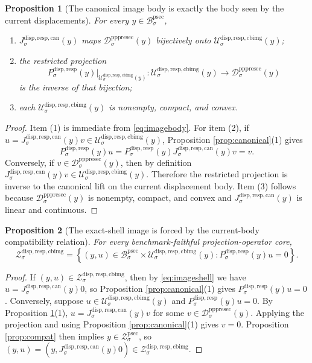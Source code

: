 \documentclass[11pt]{article}
\newcommand{\ProtoSectionBody}[1]{\mathcal B_{#1}^{\mathrm{psec}}}
\newcommand{\ProtoSectionShell}[1]{\mathcal Z_{#1}^{\mathrm{psec}}}
\newcommand{\PrePreProtoSectionResidualBody}[1]{\mathcal D_{#1}^{\mathrm{pppresec}}}
\newcommand{\SubstrateProjection}[1]{P_{#1}^{\mathrm{disp,resp}}}
\newcommand{\CanonicalLift}[1]{J_{#1}^{\mathrm{disp,resp,can}}}
\newcommand{\CanonicalImageBody}[1]{\mathcal U_{#1}^{\mathrm{disp,resp,cbimg}}}
\newcommand{\CanonicalImageShell}[1]{\mathcal Z_{#1}^{\mathrm{disp,resp,cbimg}}}
\newtheorem{proposition}{Proposition}
\begin{document}
\begin{proposition}[The canonical image body is exactly the body seen by the current displacements]
\label{prop:reconstructbody}
For every \(y\in\ProtoSectionBody{\sigma}\),
\begin{enumerate}
    \item \(\CanonicalLift{\sigma}(y)\) maps \(\PrePreProtoSectionResidualBody{\sigma}(y)\) bijectively onto \(\CanonicalImageBody{\sigma}(y)\);
    \item the restricted projection
    \[
    \SubstrateProjection{\sigma}(y)\big|_{\CanonicalImageBody{\sigma}(y)}
    :
    \CanonicalImageBody{\sigma}(y)\to\PrePreProtoSectionResidualBody{\sigma}(y)
    \]
    is the inverse of that bijection;
    \item each \(\CanonicalImageBody{\sigma}(y)\) is nonempty, compact, and convex.
\end{enumerate}
\end{proposition}

\begin{proof}
Item (1) is immediate from \eqref{eq:imagebody}. For item (2), if \(u=\CanonicalLift{\sigma}(y)v\in\CanonicalImageBody{\sigma}(y)\), Proposition \ref{prop:canonical}(1) gives
\[
\SubstrateProjection{\sigma}(y)u
=
\SubstrateProjection{\sigma}(y)\CanonicalLift{\sigma}(y)v
=
v.
\]
Conversely, if \(v\in\PrePreProtoSectionResidualBody{\sigma}(y)\), then by definition \(\CanonicalLift{\sigma}(y)v\in\CanonicalImageBody{\sigma}(y)\). Therefore the restricted projection is inverse to the canonical lift on the current displacement body. Item (3) follows because \(\PrePreProtoSectionResidualBody{\sigma}(y)\) is nonempty, compact, and convex and \(\CanonicalLift{\sigma}(y)\) is linear and continuous.
\end{proof}

\begin{proposition}[The exact-shell image is forced by the current-body compatibility relation]
\label{prop:reconstructshell}
For every benchmark-faithful projection-operator core,
\[
\CanonicalImageShell{\sigma}
=
\left\{
(y,u)\in\ProtoSectionBody{\sigma}\times\CanonicalImageBody{\sigma}(y):
\SubstrateProjection{\sigma}(y)u=0
\right\}.
\]
\end{proposition}

\begin{proof}
If \((y,u)\in\CanonicalImageShell{\sigma}\), then by \eqref{eq:imageshell} we have \(u=\CanonicalLift{\sigma}(y)0\), so Proposition \ref{prop:canonical}(1) gives \(\SubstrateProjection{\sigma}(y)u=0\). Conversely, suppose \(u\in\CanonicalImageBody{\sigma}(y)\) and \(\SubstrateProjection{\sigma}(y)u=0\). By Proposition \ref{prop:reconstructbody}(1), \(u=\CanonicalLift{\sigma}(y)v\) for some \(v\in\PrePreProtoSectionResidualBody{\sigma}(y)\). Applying the projection and using Proposition \ref{prop:canonical}(1) gives \(v=0\). Proposition \ref{prop:compat} then implies \(y\in\ProtoSectionShell{\sigma}\), so \((y,u)=(y,\CanonicalLift{\sigma}(y)0)\in\CanonicalImageShell{\sigma}\).
\end{proof}
\end{document}
